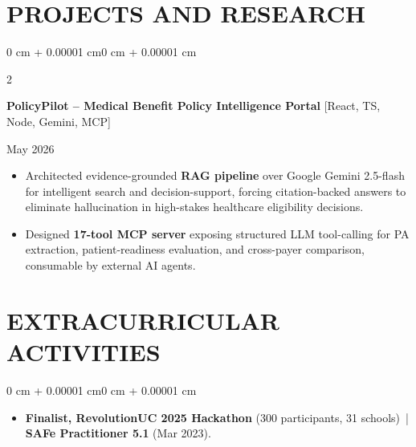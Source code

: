 \documentclass[10pt, letterpaper]{article}
\newenvironment{highlights}{
    \begin{itemize}[
        topsep=0.10 cm,
        parsep=0.06 cm,
        partopsep=0pt,
        itemsep=0.06 cm,
        leftmargin=12pt
    ]
}{
    \end{itemize}
}
\newenvironment{onecolentry}{
    \begin{adjustwidth}{0 cm + 0.00001 cm}{0 cm + 0.00001 cm}
}{
    \end{adjustwidth}
}
\newenvironment{twocolentry}[2][]{
    \onecolentry
    \def\secondColumn{#2}
    \setcolumnwidth{\fill, 4.5 cm}
    \begin{paracol}{2}
}{
    \switchcolumn \raggedleft \secondColumn
    \end{paracol}
    \endonecolentry
}
\begin{document}
\section{PROJECTS AND RESEARCH}
\begin{twocolentry}{May 2026}
\textbf{PolicyPilot -- Medical Benefit Policy Intelligence Portal} [React, TS, Node, Gemini, MCP]
\end{twocolentry}
\begin{highlights}
  \item Architected evidence-grounded \textbf{RAG pipeline} over Google Gemini 2.5-flash for intelligent search and decision-support, forcing citation-backed answers to eliminate hallucination in high-stakes healthcare eligibility decisions.
  \item Designed \textbf{17-tool MCP server} exposing structured LLM tool-calling for PA extraction, patient-readiness evaluation, and cross-payer comparison, consumable by external AI agents.
\end{highlights}

\section{EXTRACURRICULAR ACTIVITIES}
\begin{onecolentry}
\begin{highlights}
  \item \textbf{Finalist, RevolutionUC 2025 Hackathon} (300 participants, 31 schools) \,|\, \textbf{SAFe Practitioner 5.1} (Mar 2023).
\end{highlights}
\end{onecolentry}
\end{document}
